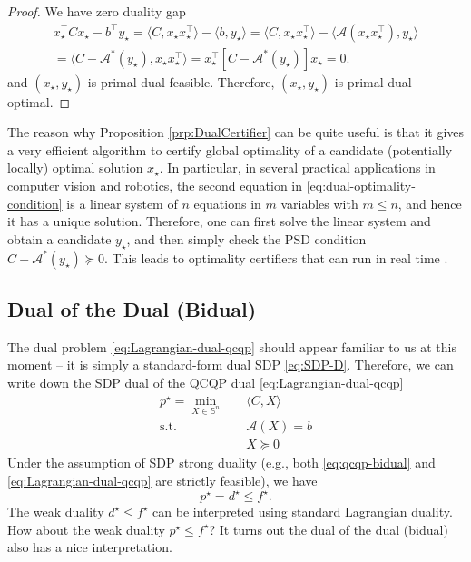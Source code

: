 \documentclass[
]{book}
\theoremstyle{definition}
\theoremstyle{definition}
\theoremstyle{definition}
\theoremstyle{definition}
\theoremstyle{remark}
\begin{document}
\begin{proof}
We have zero duality gap
\begin{equation}
\begin{split}
x_\star^\top C x_\star - b^\top y_\star = \langle C, x_\star x_\star^\top \rangle - \langle b, y_\star \rangle = \langle C, x_\star x_\star^\top \rangle - \langle \mathcal{A}(x_\star x_\star^\top), y_\star \rangle \\
= \langle C - \mathcal{A}^*(y_\star),  x_\star x_\star^\top \rangle = x_\star^\top[ C - \mathcal{A}^*(y_\star) ] x_\star = 0.
\end{split}
\end{equation}
and \((x_\star, y_\star)\) is primal-dual feasible. Therefore, \((x_\star, y_\star)\) is primal-dual optimal.
\end{proof}

The reason why Proposition \ref{prp:DualCertifier} can be quite useful is that it gives a very efficient algorithm to certify global optimality of a candidate (potentially locally) optimal solution \(x_\star\). In particular, in several practical applications in computer vision and robotics, the second equation in \eqref{eq:dual-optimality-condition} is a linear system of \(n\) equations in \(m\) variables with \(m\leq n\), and hence it has a unique solution. Therefore, one can first solve the linear system and obtain a candidate \(y_\star\), and then simply check the PSD condition \(C - \mathcal{A}^*(y_\star) \succeq 0\). This leads to optimality certifiers that can run in real time \citep{garcia21ivc-certifiable} \citep{holmes23ral-efficient}.

\subsection{Dual of the Dual (Bidual)}\label{dual-of-the-dual-bidual}

The dual problem \eqref{eq:Lagrangian-dual-qcqp} should appear familiar to us at this moment -- it is simply a standard-form dual SDP \eqref{eq:SDP-D}. Therefore, we can write down the SDP dual of the QCQP dual \eqref{eq:Lagrangian-dual-qcqp}
\begin{equation}
\begin{split}
p^\star = \min_{X \in \mathbb{S}^{n}} & \quad \langle C, X \rangle \\
\mathrm{s.t.}& \quad \mathcal{A}(X) = b \\
& \quad X \succeq 0
\end{split}
\label{eq:qcqp-bidual}
\end{equation}
Under the assumption of SDP strong duality (e.g., both \eqref{eq:qcqp-bidual} and \eqref{eq:Lagrangian-dual-qcqp} are strictly feasible), we have
\[
p^\star = d^\star \leq f^\star.
\]
The weak duality \(d^\star \leq f^\star\) can be interpreted using standard Lagrangian duality. How about the weak duality \(p^\star \leq f^\star\)?
It turns out the dual of the dual (bidual) also has a nice interpretation.
\end{document}

